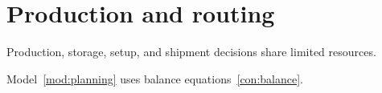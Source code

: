 \documentclass{article}
\begin{document}
\section*{Production and routing}
Production, storage, setup, and shipment decisions share limited resources.


Model~\eqref{mod:planning} uses balance equations~\eqref{con:balance}.
\end{document}
